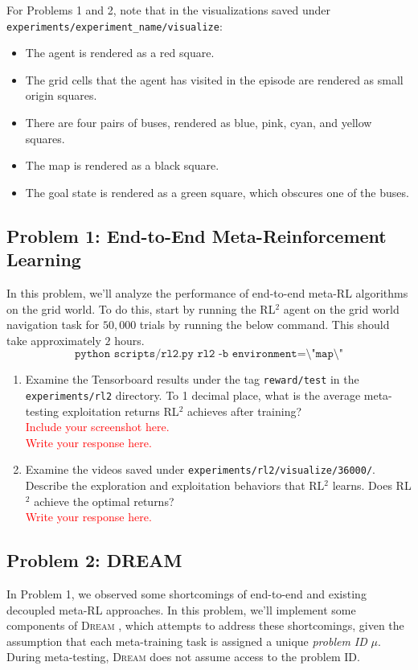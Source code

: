 \documentclass[12pt]{article}
\newcommand{\rl}{{RL$^2$ }}
\newcommand{\dream}{\textsc{Dream }}
\begin{document}
For Problems 1 and 2, note that in the visualizations saved under \linebreak \texttt{experiments/experiment\_name/visualize}:
\begin{itemize}
    \item The agent is rendered as a red square.
    \item The grid cells that the agent has visited in the episode are rendered as small origin squares.
    \item There are four pairs of buses, rendered as blue, pink, cyan, and yellow squares.
    \item The map is rendered as a black square.
    \item The goal state is rendered as a green square, which obscures one of the buses.
\end{itemize}

\subsection*{Problem 1: End-to-End Meta-Reinforcement Learning}

In this problem, we'll analyze the performance of end-to-end meta-RL algorithms on the grid world. To do this, start by running the \rl agent on the grid world navigation task for $50,000$ trials by running the below command. This should take approximately $2$ hours.
\begin{equation*}
    \texttt{python scripts/rl2.py rl2 -b environment=\textbackslash"map\textbackslash"}
\end{equation*}

\begin{enumerate}
    \item Examine the Tensorboard results under the tag \texttt{reward/test} in the \texttt{experiments/rl2} directory. To 1 decimal place, what is the average meta-testing exploitation returns \rl achieves after training? \\
    \textcolor{red}{Include your screenshot here.} \\
    \textcolor{red}{Write your response here.}
    \item Examine the videos saved under \texttt{experiments/rl2/visualize/36000/}. Describe the exploration and exploitation behaviors that \rl learns. Does \rl achieve the optimal returns? \\
    \textcolor{red}{Write your response here.}
\end{enumerate}

\subsection*{Problem 2: DREAM}
In Problem 1, we observed some shortcomings of end-to-end and existing decoupled meta-RL approaches.
In this problem, we'll implement some components of \dream, which attempts to address these shortcomings, given the assumption that each meta-training task is assigned a unique \emph{problem ID} $\mu$.
During meta-testing, \dream does not assume access to the problem ID.
\end{document}
